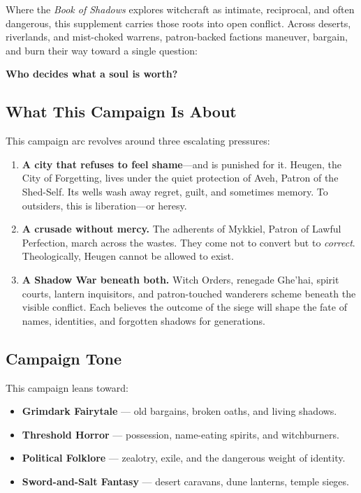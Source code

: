 \documentclass[11pt]{book}
\begin{document}
Where the \emph{Book of Shadows} explores witchcraft as intimate, reciprocal, and often
dangerous, this supplement carries those roots into open conflict.  
Across deserts, riverlands, and mist-choked warrens, patron-backed factions maneuver, 
bargain, and burn their way toward a single question:

\begin{center}
\textbf{Who decides what a soul is worth?}
\end{center}

\subsection{What This Campaign Is About}
This campaign arc revolves around three escalating pressures:

\begin{enumerate}[leftmargin=*]
    \item \textbf{A city that refuses to feel shame}---and is punished for it.  
    Heugen, the City of Forgetting, lives under the quiet protection of Aveh, Patron of the Shed-Self.  
    Its wells wash away regret, guilt, and sometimes memory.  
    To outsiders, this is liberation---or heresy.

    \item \textbf{A crusade without mercy.}  
    The adherents of Mykkiel, Patron of Lawful Perfection, march across the wastes.  
    They come not to convert but to \emph{correct}.  
    Theologically, Heugen cannot be allowed to exist.

    \item \textbf{A Shadow War beneath both.}  
    Witch Orders, renegade Ghe'hai, spirit courts, lantern inquisitors, 
    and patron-touched wanderers scheme beneath the visible conflict.  
    Each believes the outcome of the siege will shape the fate of names, 
    identities, and forgotten shadows for generations.
\end{enumerate}

\subsection{Campaign Tone}
This campaign leans toward:

\begin{itemize}[leftmargin=*]
    \item \textbf{Grimdark Fairytale} --- old bargains, broken oaths, and living shadows.
    \item \textbf{Threshold Horror} --- possession, name-eating spirits, and witchburners.
    \item \textbf{Political Folklore} --- zealotry, exile, and the dangerous weight of identity.
    \item \textbf{Sword-and-Salt Fantasy} --- desert caravans, dune lanterns, temple sieges.
\end{itemize}
\end{document}
